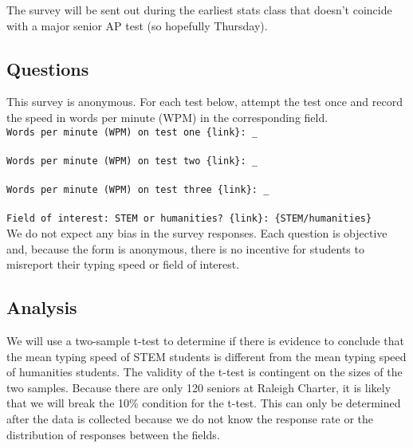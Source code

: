 \documentclass{article}
\begin{document}
The survey will be sent out during the earliest stats class that doesn't
coincide with a major senior AP test (so hopefully Thursday).

\subsection{Questions}

This survey is anonymous. For each test below, attempt the test once and record
the speed in words per minute (WPM) in the corresponding field. \\

\noindent
\verb|Words per minute (WPM) on test one {link}: _ | \\\\
\verb|Words per minute (WPM) on test two {link}: _ | \\\\
\verb|Words per minute (WPM) on test three {link}: _ | \\\\
\verb|Field of interest: STEM or humanities? {link}: {STEM/humanities} | \\

We do not expect any bias in the survey responses. Each question is objective
and, because the form is anonymous, there is no incentive for students to
misreport their typing speed or field of interest.

\subsection{Analysis}

We will use a two-sample t-test to determine if there is evidence to conclude
that the mean typing speed of STEM students is different from the mean typing
speed of humanities students. The validity of the t-test is contingent on the
sizes of the two samples. Because there are only 120 seniors at Raleigh
Charter, it is likely that we will break the 10\% condition for the t-test.
This can only be determined after the data is collected because we do not know
the response rate or the distribution of responses between the fields.
\end{document}
